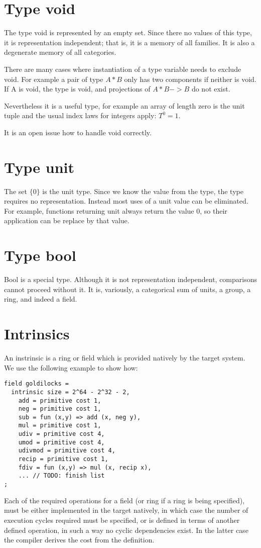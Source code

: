 \documentclass[oneside]{book}
\theoremstyle{plain}
\theoremstyle{definition}
\theoremstyle{plain}
\begin{document}
\section{Type void}
The type void is represented by an empty set. Since there no values
of this type, it is representation independent; that is, it is a memory
of all families. It is also a degenerate memory of all categories.

There are many cases where instantiation of a type variable needs to exclude void.
For example a pair of type $A * B$ only has two components if neither is void.
If A is void, the type is void, and projections of $A * B -> B$ do not exist.

Nevertheless it is a useful type, for example an array of length zero is the
unit tuple and the usual index laws for integers apply: $T^0 = 1$.

It is an open issue how to handle void correctly.

\section{Type unit}
The set $\{0\}$ is the unit type. Since we know the value from the type,
the type requires no representation. Instead most uses of a unit value
can be eliminated. For example, functions returning unit always return
the value 0, so their application can be replace by that value.

\section{Type bool}
Bool is a special type. Although it is not representation independent,
comparisons cannot proceed without it. It is, variously, a categorical
sum of units, a group, a ring, and indeed a field.



\section{Intrinsics}
An instrinsic is a ring or field which is provided natively by the target system.
We use the following example to show how:
\begin{verbatim}
field goldilocks = 
  intrinsic size = 2^64 - 2^32 - 2, 
    add = primitive cost 1,
    neg = primitive cost 1,
    sub = fun (x,y) => add (x, neg y),
    mul = primitive cost 1,
    udiv = primitive cost 4,
    umod = primitive cost 4,
    udivmod = primitive cost 4,
    recip = primitive cost 1,
    fdiv = fun (x,y) => mul (x, recip x),
    ... // TODO: finish list
;
\end{verbatim}
Each of the required operations for a field (or ring if a ring is being specified),
must be either implemented in the target natively, in which case the number of
execution cycles required must be specified, or is defined in terms of another
defined operation, in such a way no cyclic dependencies exist. In the latter case
the compiler derives the cost from the definition.
\end{document}
